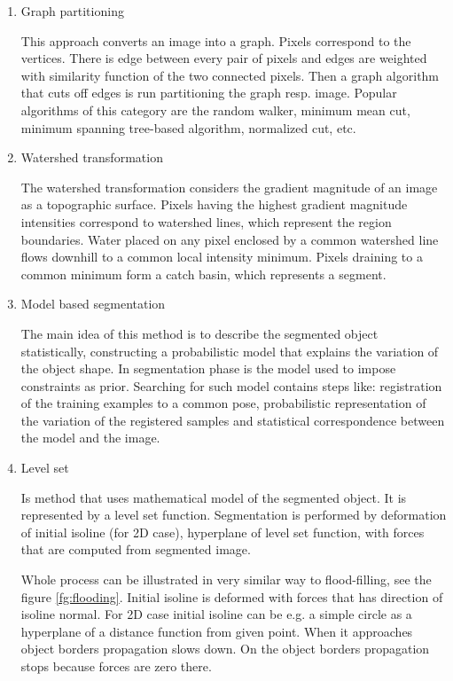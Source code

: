 \begin{enumerate}
  \item Graph partitioning

This approach converts an image into a graph.
Pixels correspond to the vertices.
There is edge between every pair of pixels and edges are weighted with similarity function of the two connected pixels.
Then a graph algorithm that cuts off edges is run partitioning the graph resp. image.
Popular algorithms of this category are the random walker, minimum mean cut, minimum spanning tree-based algorithm, normalized cut, etc.

  \item Watershed transformation

  The watershed transformation considers the gradient magnitude of an image as a topographic surface.
Pixels having the highest gradient magnitude intensities correspond to watershed lines, which represent the region boundaries.
Water placed on any pixel enclosed by a common watershed line flows downhill to a common local intensity minimum.
Pixels draining to a common minimum form a catch basin, which represents a segment.

  \item Model based segmentation

  The main idea of this method is to describe the segmented object statistically, constructing a probabilistic model that explains the variation of the object shape.
In segmentation phase is the model used to impose constraints as prior.
Searching for such model contains steps like: registration of the training examples to a common pose, probabilistic representation of the variation of the registered samples and statistical correspondence between the model and the image.

  \item Level set

\par
Is method that uses mathematical model of the segmented object.
It is represented by a level set function.
Segmentation is performed by deformation of initial isoline (for 2D case), hyperplane of level set function, with forces that are computed from segmented image.

\par
Whole process can be illustrated in very similar way to flood-filling, see the figure \ref{fg:flooding}.
Initial isoline is deformed with forces that has direction of isoline normal.
For 2D case initial isoline can be e.g. a simple circle as a hyperplane of a distance function from given point.
When it approaches object borders propagation slows down.
On the object borders propagation stops because forces are zero there.


\end{enumerate}
